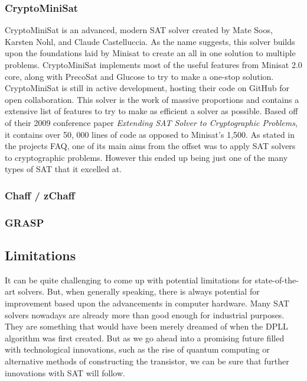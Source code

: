 \documentclass{article}
\begin{document}
\subsubsection{CryptoMiniSat}
CryptoMiniSat is an advanced, modern SAT solver created by Mate Soos, Karsten Nohl, and Claude Castelluccia\cite{cryptominisat}.
As the name suggests, this solver builds upon the foundations laid by Minisat to create an all in one solution to multiple 
problems. CryptoMiniSat implements most of the useful features from Minisat 2.0 core, along with PrecoSat and Glucose to try to 
make a one-stop solution. CryptoMiniSat is still in active development, hosting their code on GitHub for open collaboration. This 
solver is the work of massive proportions and contains a extensive list of features to try to make as efficient a solver as 
possible. Based off of their 2009 conference paper \textit{Extending SAT Solver to Cryptographic Problems}, it contains over 50,
000 lines of code as opposed to Minisat's 1,500. As stated in the projects FAQ, one of its main aims from the offset was to apply 
SAT solvers to cryptographic problems. However this ended up being just one of the many types of SAT that it excelled at.

\subsubsection{Chaff / zChaff}
\lipsum[2-3]
\subsubsection{GRASP}
\lipsum[2-3]

\subsection{Limitations}
It can be quite challenging to come up with potential limitations for state-of-the-art solvers. But, when generally speaking,
there is always potential for improvement based upon the advancements in computer hardware. Many SAT solvers nowadays are already
more than good enough for industrial purposes. They are something that would have been merely dreamed of when the DPLL algorithm
was first created. But as we go ahead into a promising future filled with technological innovations, such as the rise of quantum
computing or alternative methods of constructing the transistor, we can be sure that further innovations with SAT will follow.
\end{document}
